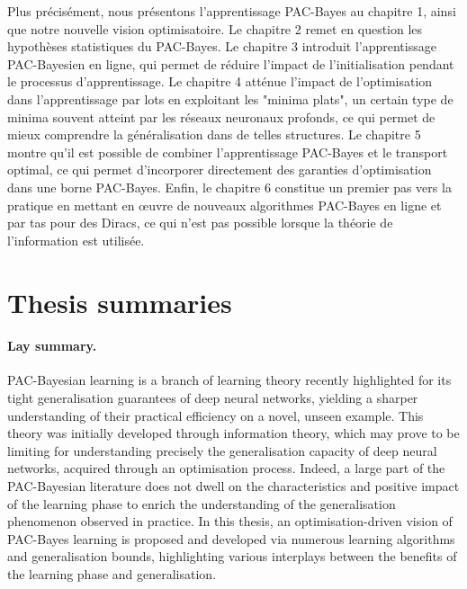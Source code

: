Plus précisément, nous présentons l'apprentissage PAC-Bayes au chapitre 1, ainsi que notre nouvelle vision optimisatoire. Le chapitre 2 remet en question les hypothèses statistiques du PAC-Bayes. Le chapitre 3 introduit l'apprentissage PAC-Bayesien en ligne, qui permet de réduire l'impact de l'initialisation pendant le processus d'apprentissage. Le chapitre 4 atténue l'impact de l'optimisation dans l'apprentissage par lots en exploitant les "minima plats", un certain type de minima souvent atteint par les réseaux neuronaux profonds, ce qui permet de mieux comprendre la généralisation dans de telles structures. Le chapitre 5 montre qu'il est possible de combiner l'apprentissage PAC-Bayes et le transport optimal, ce qui permet d'incorporer directement des garanties d'optimisation dans une borne PAC-Bayes. Enfin, le chapitre 6 constitue un premier pas vers la pratique en mettant en œuvre de nouveaux algorithmes PAC-Bayes en ligne et par tas pour des Diracs, ce qui n'est pas possible lorsque la théorie de l'information est utilisée.

\section*{Thesis summaries}

\paragraph*{Lay summary.}
PAC-Bayesian learning is a branch of learning theory recently highlighted for its tight generalisation guarantees of deep neural networks, yielding a sharper understanding of their practical efficiency on a novel, unseen example. This theory was initially developed through information theory, which may prove to be limiting for understanding precisely the generalisation capacity of deep neural networks, acquired through an optimisation process. Indeed, a large part of the PAC-Bayesian literature does not dwell on the characteristics and positive impact of the learning phase to enrich the understanding of the generalisation phenomenon observed in practice. In this thesis, an optimisation-driven vision of PAC-Bayes learning is proposed and developed via numerous learning algorithms and generalisation bounds, highlighting various interplays between the benefits of the learning phase and generalisation.

